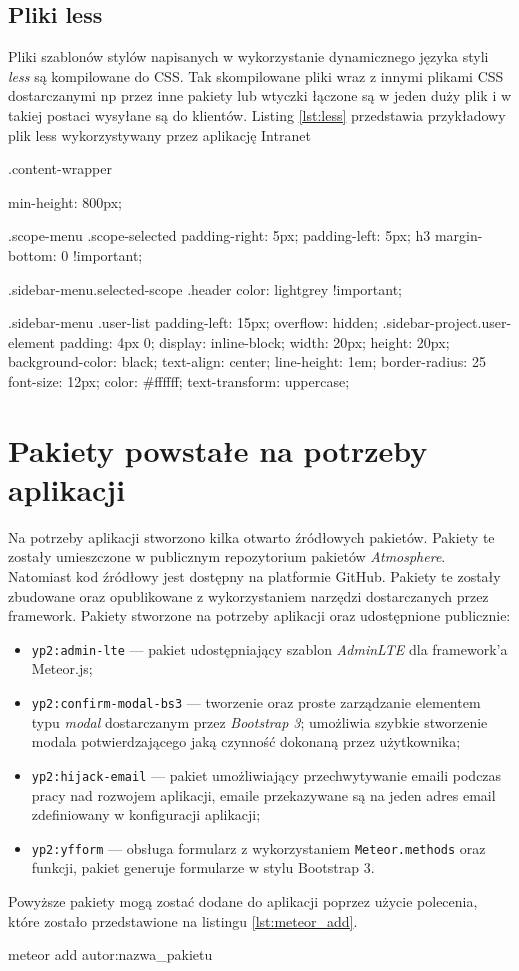 \subsection{Pliki less}
Pliki szablonów stylów napisanych w wykorzystanie dynamicznego języka styli \emph{less} są kompilowane do CSS. Tak skompilowane pliki wraz z innymi plikami CSS dostarczanymi np przez inne pakiety lub wtyczki łączone są w jeden duży plik i w takiej postaci wysyłane są do klientów. Listing \ref{lst:less} przedstawia przykładowy plik less wykorzystywany przez aplikację Intranet
\begin{css}[caption={Przykładowy plik less},label={lst:less}]
.content-wrapper {
  min-height: 800px;

}

.scope-menu {
  .scope-selected {
    padding-right: 5px;
    padding-left: 5px;
  }
  h3 {
    margin-bottom: 0 !important;
  }
}

.sidebar-menu.selected-scope {
  .header {
    color: lightgrey !important;
  }
}

.sidebar-menu {
  .user-list {
    padding-left: 15px;
    overflow: hidden;
    .sidebar-project.user-element {
      padding: 4px 0;
      display: inline-block;
      width: 20px;
      height: 20px;
      background-color: black;
      text-align: center;
      line-height: 1em;
      border-radius: 25%
      font-size: 12px;
      color: #ffffff;
      text-transform: uppercase;
    }
  }
}
\end{css}
  
\section{Pakiety powstałe na potrzeby aplikacji}
Na potrzeby aplikacji stworzono kilka otwarto źródłowych pakietów. Pakiety te zostały umieszczone w publicznym repozytorium pakietów \emph{Atmosphere}. Natomiast kod źródłowy jest dostępny na platformie GitHub. Pakiety te zostały zbudowane oraz opublikowane z wykorzystaniem narzędzi dostarczanych przez framework. Pakiety stworzone na potrzeby aplikacji oraz udostępnione publicznie:
\begin{itemize}
 \item \verb|yp2:admin-lte| --- pakiet udostępniający szablon \emph{AdminLTE} dla framework'a Meteor.js;
 \item \verb|yp2:confirm-modal-bs3| --- tworzenie oraz proste zarządzanie elementem typu \emph{modal} dostarczanym przez \emph{Bootstrap 3}; umożliwia szybkie stworzenie modala potwierdzającego jaką czynność dokonaną przez użytkownika;
 \item \verb|yp2:hijack-email| --- pakiet umożliwiający przechwytywanie emaili podczas pracy nad rozwojem aplikacji, emaile przekazywane są na jeden adres email zdefiniowany w konfiguracji aplikacji;
 \item \verb|yp2:yfform| --- obsługa formularz z wykorzystaniem \verb|Meteor.methods| oraz funkcji, pakiet generuje formularze w stylu Bootstrap 3.
\end{itemize}

Powyższe pakiety mogą zostać dodane do aplikacji poprzez użycie polecenia, które zostało przedstawione na listingu \ref{lst:meteor_add}.
\begin{bash}[caption={Dodwanie pakietów do aplikacji},label={lst:meteor_add}]
meteor add autor:nazwa_pakietu
\end{bash}
